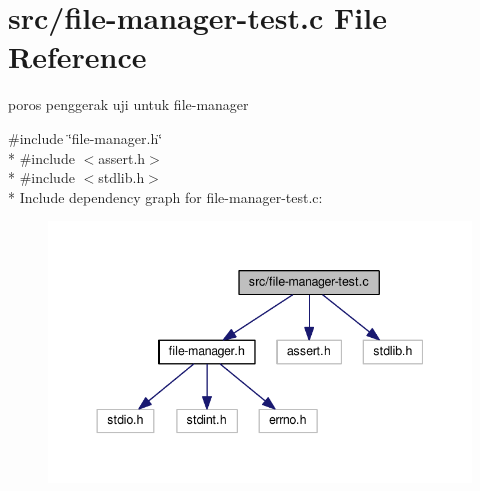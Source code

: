 \hypertarget{file-manager-test_8c}{\section{src/file-\/manager-\/test.c File Reference}
\label{file-manager-test_8c}
}


poros penggerak uji untuk file-\/manager  


{\ttfamily \#include \char`\"{}file-\/manager.\-h\char`\"{}}\\*
{\ttfamily \#include $<$assert.\-h$>$}\\*
{\ttfamily \#include $<$stdlib.\-h$>$}\\*
Include dependency graph for file-\/manager-\/test.c\-:\nopagebreak
\begin{figure}[H]
\begin{center}
\leavevmode
\includegraphics[width=344pt]{file-manager-test_8c__incl}
\end{center}
\end{figure}
